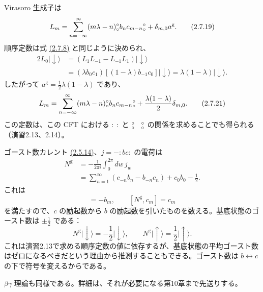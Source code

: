 Virasoro 生成子は
\begin{equation}
L_m=\sum_{n=-\infty}^\infty(m\lambda-n)
\mathopen{{}^{\circ}_{\circ}}b_nc_{m-n}\mathclose{{}^{\circ}_{\circ}}+\delta_{m,0}a^{\mathrm g}.
\tag{2.7.19}\label{eq:2.7.19}
\end{equation}
順序定数は式 \hyperref[eq:2.7.8]{(2.7.8)} と同じように決められ、
\begin{equation}
\begin{aligned}
2L_0\lvert\downarrow\rangle
&=(L_1L_{-1}-L_{-1}L_1)\lvert\downarrow\rangle\\
&=(\lambda b_0c_1)[(1-\lambda)b_{-1}c_0]\lvert\downarrow\rangle
=\lambda(1-\lambda)\lvert\downarrow\rangle.
\end{aligned}
\tag{2.7.20}\label{eq:2.7.20}
\end{equation}
したがって $a^{\mathrm g}=\frac12\lambda(1-\lambda)$ であり、
\begin{equation}
L_m=\sum_{n=-\infty}^\infty(m\lambda-n)
\mathopen{{}^{\circ}_{\circ}}b_nc_{m-n}\mathclose{{}^{\circ}_{\circ}}+\frac{\lambda(1-\lambda)}2\delta_{m,0}.
\tag{2.7.21}\label{eq:2.7.21}
\end{equation}
この定数は、この CFT における $:\ :$ と $\canorm{\phantom X}$ の関係を求めることでも得られる（演習2.13、2.14）。

ゴースト数カレント \hyperref[eq:2.5.14]{(2.5.14)}、$j=-:bc:$ の電荷は
\begin{equation}
\begin{aligned}
N^{\mathrm g}&=-\frac1{2\pi i}\int_0^{2\pi}dw\,j_w\\
&=\sum_{n=1}^\infty(c_{-n}b_n-b_{-n}c_n)+c_0b_0-\frac12.
\end{aligned}
\tag{2.7.22}\label{eq:2.7.22}
\end{equation}
これは
\begin{equation}
[N^{\mathrm g},b_m]=-b_m,\qquad
[N^{\mathrm g},c_m]=c_m
\tag{2.7.23}\label{eq:2.7.23}
\end{equation}
を満たすので、$c$ の励起数から $b$ の励起数を引いたものを数える。基底状態のゴースト数は $\pm\frac12$ である：
\begin{equation}
N^{\mathrm g}\lvert\downarrow\rangle=-\frac12\lvert\downarrow\rangle,
\qquad
N^{\mathrm g}\lvert\uparrow\rangle=\frac12\lvert\uparrow\rangle.
\tag{2.7.24}\label{eq:2.7.24}
\end{equation}
これは演習2.13で求める順序定数の値に依存するが、基底状態の平均ゴースト数はゼロになるべきだという理由から推測することもできる。ゴースト数は $b\leftrightarrow c$ の下で符号を変えるからである。

$\beta\gamma$ 理論も同様である。詳細は、それが必要になる第10章まで先送りする。

